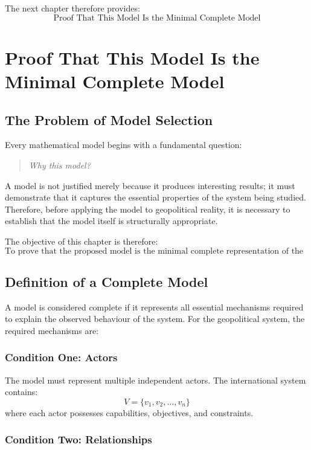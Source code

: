 \documentclass[11pt,openany]{book}
\theoremstyle{plain}
\theoremstyle{definition}
\begin{document}
The next chapter therefore provides:
\[
\boxed{
\text{Proof That This Model Is the Minimal Complete Model}
}
\]

\chapter{Proof That This Model Is the Minimal Complete Model}

\section*{The Problem of Model Selection}

Every mathematical model begins with a fundamental question:
\begin{quote}
\textit{Why this model?}
\end{quote}

A model is not justified merely because it produces interesting results; it must demonstrate that it captures the essential properties of the system being studied. Therefore, before applying the model to geopolitical reality, it is necessary to establish that the model itself is structurally appropriate.

The objective of this chapter is therefore:
\[
\boxed{
\text{To prove that the proposed model is the minimal complete representation of the geopolitical system.}
}
\]

\section*{Definition of a Complete Model}

A model is considered complete if it represents all essential mechanisms required to explain the observed behaviour of the system. For the geopolitical system, the required mechanisms are:

\subsection*{Condition One: Actors}

The model must represent multiple independent actors. The international system contains:
\[
V = \{v_1, v_2, \ldots, v_n\}
\]
where each actor possesses capabilities, objectives, and constraints.

\subsection*{Condition Two: Relationships}
\end{document}
